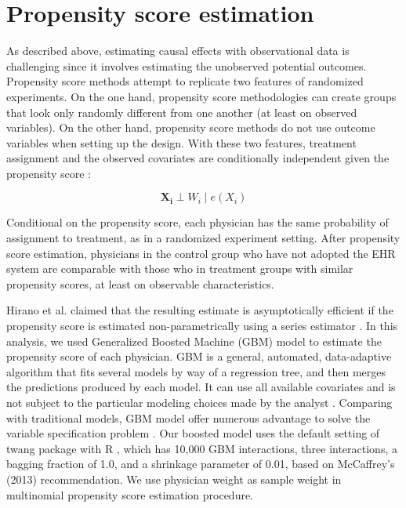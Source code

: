\documentclass[12pt]{report}
\begin{document}
\section{Propensity score estimation}
As described above, estimating causal effects with observational data is challenging since it involves estimating the unobserved potential outcomes. Propensity score methods attempt to replicate two features of randomized experiments. On the one hand, propensity score methodologies can create groups that look only randomly different from one another (at least on observed variables). On the other hand, propensity score methods do not use outcome variables when setting up the design. With these two features, treatment assignment and the observed covariates are conditionally independent given the propensity score \citep{guo2014propensity}:

\begin{equation*}
\boldsymbol{X_i} \perp W_i \mid e(X_i)
\end{equation*}

Conditional on the propensity score, each physician has the same probability of assignment to treatment, as in a randomized experiment setting. After propensity score estimation, physicians in the control group who have not adopted the EHR system are comparable with those who in treatment groups with similar propensity scores, at least on observable characteristics. 

Hirano et al. claimed that the resulting estimate is asymptotically efficient if the propensity score is estimated non-parametrically using a series estimator \citep{hirano2003efficient}. In this analysis, we used Generalized Boosted Machine (GBM) model \citep{mccaffrey2004propensity} to estimate the propensity score of each physician. GBM is a general, automated, data-adaptive algorithm that fits several models by way of a regression tree, and then merges the predictions produced by each model. It can use all available covariates and is not subject to the particular modeling choices made by the analyst \citep{hillm2015short}. Comparing with traditional models, GBM model offer numerous advantage to solve the variable specification problem \citep{guo2009propensity}. Our boosted model uses the default setting of twang package \citep{mccaffrey2013tutorial} with R \citep{rbase}, which has 10,000 GBM interactions, three interactions, a bagging fraction of 1.0, and a shrinkage parameter of 0.01, based on McCaffrey's (2013) recommendation. We use physician weight as sample weight in multinomial propensity score estimation procedure.
\end{document}
